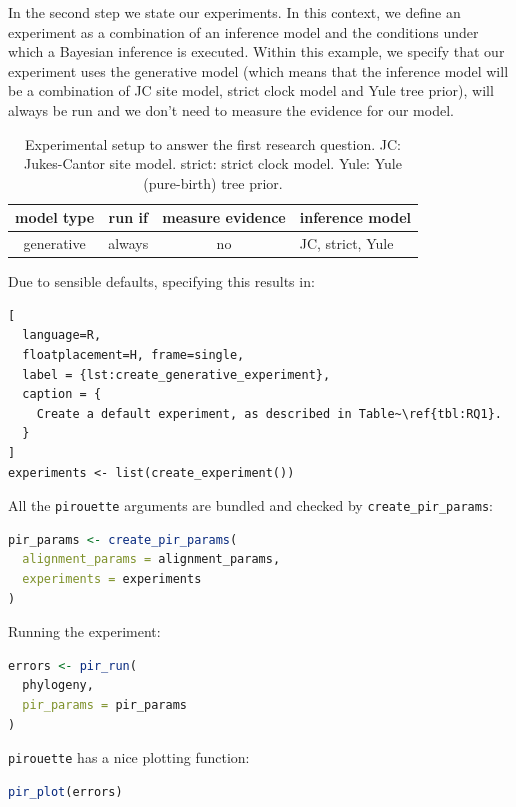 \documentclass{article}
\begin{document}
In the second step we state our experiments. In this context, we
define an experiment as a combination of an inference model
and the conditions under which a Bayesian inference is executed.
Within this example, we specify that our experiment uses the
generative model (which means that the inference model will be a combination of JC site model, strict clock model and Yule tree prior), will always be run and we don't need to measure the evidence for our model.

\begin{table}
  \begin{tabular}{ | c | c | c | l | }
    \hline
    \textbf{model type} & \textbf{run if} & \textbf{measure evidence} & \textbf{inference model} \\ 
    \hline
    generative & always & no & JC, strict, Yule \\
    \hline
  \end{tabular}
  \caption{
    Experimental setup to answer the first research question.
    JC: Jukes-Cantor site model.
    strict: strict clock model.
    Yule: Yule (pure-birth) tree prior.
  }
  \label{tbl:RQ1}
\end{table}

Due to sensible defaults, specifying this
results in:

\begin{lstlisting}[
  language=R, 
  floatplacement=H, frame=single,
  label = {lst:create_generative_experiment},
  caption = {
    Create a default experiment, as described in Table~\ref{tbl:RQ1}.
  }
]
experiments <- list(create_experiment())
\end{lstlisting}

All the \verb;pirouette; arguments are bundled
and checked by \verb;create_pir_params;:

\begin{lstlisting}[language=R, floatplacement=H, frame=single]
pir_params <- create_pir_params(
  alignment_params = alignment_params,
  experiments = experiments
)
\end{lstlisting}

Running the experiment:

\begin{lstlisting}[language=R, floatplacement=H, frame=single]
errors <- pir_run(
  phylogeny,
  pir_params = pir_params
)
\end{lstlisting}

\verb;pirouette; has a nice plotting function:

\begin{lstlisting}[language=R, floatplacement=H, frame=single]
pir_plot(errors)
\end{lstlisting}
\end{document}
